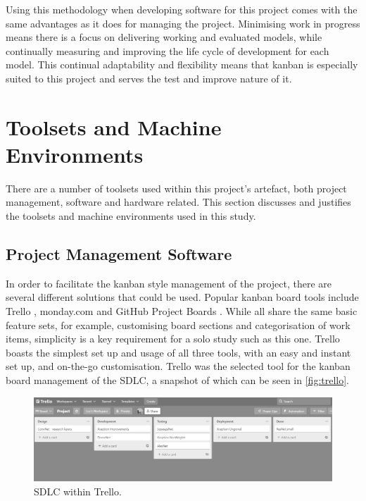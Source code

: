 Using this methodology when developing software for this project comes with the same advantages as it does for managing the project. Minimising work in progress means there is a focus on delivering working and evaluated models, while continually measuring and improving the life cycle of development for each model. This continual adaptability and flexibility means that kanban is especially suited to this project and serves the test and improve nature of it.

\section{Toolsets and Machine Environments}
There are a number of toolsets used within this project's artefact, both project management, software and hardware related. This section discusses and justifies the toolsets and machine environments used in this study.

\subsection{Project Management Software}
In order to facilitate the kanban style management of the project, there are several different solutions that could be used. Popular kanban board tools include Trello \citep{Trello41:online}, monday.com \citep{mondayco9:online} and GitHub Project Boards \citep{Aboutpro84:online}. While all share the same basic feature sets, for example, customising board sections and categorisation of work items, simplicity is a key requirement for a solo study such as this one. Trello boasts the simplest set up and usage of all three tools, with an easy and instant set up, and on-the-go customisation. Trello was the selected tool for the kanban board management of the SDLC, a snapshot of which can be seen in \autoref{fig:trello}.

\begin{figure}[H]
    \centering
    \includegraphics[width=\textwidth]{figures/trello.png}
    \caption{SDLC within Trello.}
    \label{fig:trello}
\end{figure}

